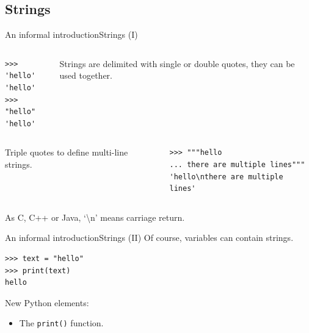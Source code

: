 \documentclass[10pt,compress]{beamer} %
\begin{document}
\subsection{Strings}
\begin{frame}[fragile]{An informal introduction}{Strings (I)}
   	\begin{columns}
		\begin{block}{}
		\begin{verbatim}
>>> 'hello'
'hello'
>>> "hello"
'hello'
\end{verbatim}
		\end{block}

		Strings are delimited with single or double quotes, they can be used together.
	\end{columns}

   	\begin{columns}
			Triple quotes to define multi-line strings.

		\begin{block}{}
			\begin{verbatim}
>>> """hello
... there are multiple lines"""
'hello\nthere are multiple lines'
\end{verbatim}
			\end{block}
	\end{columns}
	\bigskip
	As C, C++ or Java, `\textbackslash n' means carriage return.
\end{frame}

\begin{frame}[fragile]{An informal introduction}{Strings (II)}
	Of course, variables can contain strings.
	\begin{block}{}
		\begin{verbatim}
>>> text = "hello"
>>> print(text)
hello
\end{verbatim}
	\end{block}

    New Python elements:
    \begin{itemize}
        \item The \texttt{print()} function.
    \end{itemize}
\end{frame}
\end{document}
